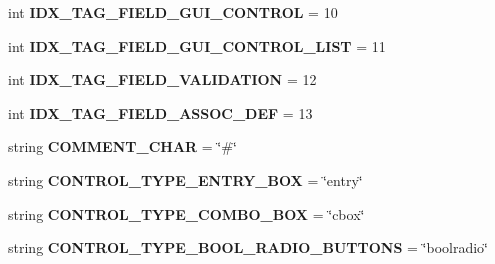 \begin{DoxyCompactItemize}
\item 
int {\bfseries I\+D\+X\+\_\+\+T\+A\+G\+\_\+\+F\+I\+E\+L\+D\+\_\+\+G\+U\+I\+\_\+\+C\+O\+N\+T\+R\+OL} = 10\hypertarget{classnegui_1_1pgparamset_1_1PGParamSet_a48de36f5304fadf16ea2dc5aa5f9aa10}{}\label{classnegui_1_1pgparamset_1_1PGParamSet_a48de36f5304fadf16ea2dc5aa5f9aa10}

\item 
int {\bfseries I\+D\+X\+\_\+\+T\+A\+G\+\_\+\+F\+I\+E\+L\+D\+\_\+\+G\+U\+I\+\_\+\+C\+O\+N\+T\+R\+O\+L\+\_\+\+L\+I\+ST} = 11\hypertarget{classnegui_1_1pgparamset_1_1PGParamSet_aee6b6d1c25ba78020df4ee6c4db6b4da}{}\label{classnegui_1_1pgparamset_1_1PGParamSet_aee6b6d1c25ba78020df4ee6c4db6b4da}

\item 
int {\bfseries I\+D\+X\+\_\+\+T\+A\+G\+\_\+\+F\+I\+E\+L\+D\+\_\+\+V\+A\+L\+I\+D\+A\+T\+I\+ON} = 12\hypertarget{classnegui_1_1pgparamset_1_1PGParamSet_a859b19d511c2d6b5b912f9fabe172b10}{}\label{classnegui_1_1pgparamset_1_1PGParamSet_a859b19d511c2d6b5b912f9fabe172b10}

\item 
int {\bfseries I\+D\+X\+\_\+\+T\+A\+G\+\_\+\+F\+I\+E\+L\+D\+\_\+\+A\+S\+S\+O\+C\+\_\+\+D\+EF} = 13\hypertarget{classnegui_1_1pgparamset_1_1PGParamSet_a2cb31672fc6311c072bf03d6cb07676e}{}\label{classnegui_1_1pgparamset_1_1PGParamSet_a2cb31672fc6311c072bf03d6cb07676e}

\item 
string {\bfseries C\+O\+M\+M\+E\+N\+T\+\_\+\+C\+H\+AR} = \char`\"{}\#\char`\"{}\hypertarget{classnegui_1_1pgparamset_1_1PGParamSet_a3699c7f57795876fe0a6d4482bfd3295}{}\label{classnegui_1_1pgparamset_1_1PGParamSet_a3699c7f57795876fe0a6d4482bfd3295}

\item 
string {\bfseries C\+O\+N\+T\+R\+O\+L\+\_\+\+T\+Y\+P\+E\+\_\+\+E\+N\+T\+R\+Y\+\_\+\+B\+OX} = \char`\"{}entry\char`\"{}\hypertarget{classnegui_1_1pgparamset_1_1PGParamSet_ab0587d666e806809e4d951b90ca67eb6}{}\label{classnegui_1_1pgparamset_1_1PGParamSet_ab0587d666e806809e4d951b90ca67eb6}

\item 
string {\bfseries C\+O\+N\+T\+R\+O\+L\+\_\+\+T\+Y\+P\+E\+\_\+\+C\+O\+M\+B\+O\+\_\+\+B\+OX} = \char`\"{}cbox\char`\"{}\hypertarget{classnegui_1_1pgparamset_1_1PGParamSet_aa948ccfa04d480ce9bc5cb8788c0efc1}{}\label{classnegui_1_1pgparamset_1_1PGParamSet_aa948ccfa04d480ce9bc5cb8788c0efc1}

\item 
string {\bfseries C\+O\+N\+T\+R\+O\+L\+\_\+\+T\+Y\+P\+E\+\_\+\+B\+O\+O\+L\+\_\+\+R\+A\+D\+I\+O\+\_\+\+B\+U\+T\+T\+O\+NS} = \char`\"{}boolradio\char`\"{}\hypertarget{classnegui_1_1pgparamset_1_1PGParamSet_a6e8ee002de013a40ea41393417b724f6}{}\label{classnegui_1_1pgparamset_1_1PGParamSet_a6e8ee002de013a40ea41393417b724f6}

\end{DoxyCompactItemize}


